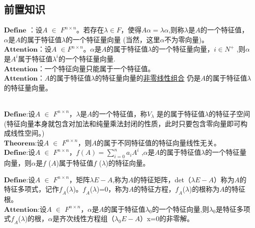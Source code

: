 \documentclass[lang=cn,10pt]{elegantbook}
\begin{document}
\subsection{前置知识}
$\mathbf{Define}$ ：设$\mathit{A}$ $\in$ $\mathit{F^{n\times n} }$。若存在$\lambda \in\mathit{F}$，使得$\mathit{A\alpha = \lambda\alpha}$,则称$\lambda$是$\mathit{A}$的一个特征值，$\alpha$是$\mathit{A}$的属于特征值$\lambda$的一个特征量向量 (当然，这里$\alpha$不为零向量)。
~\\


$\mathbf{Attention}$：设$\mathit{A}$ $\in$$\mathit{F^{n\times n} }$。$\alpha$是$\mathit{A}$的属于特征值$\lambda$的一个特征量向量，$\mathit{i} \in\mathit{N^{+} }$ ,则$\alpha$是$\mathit{A^{\mathit{i}} }$属于特征值$\mathit{\lambda^{\mathit{i}} }$的一个特征量向量.	~\\

$\mathbf{Attention}$：一个特征向量只能属于一个特征值。
~\\

$\mathbf{Attention}$：$\mathit{A}$的属于特征值$\lambda$的特征量向量的\underline{非零线性组合} 仍是$\mathit{A}$的属于特征值$\lambda$的特征量向量。

~\\


$\mathbf{Define}$:设$\mathit{A}$ $\in$ $\mathit{F^{n\times n} }$，$\lambda$是$\mathit{A}$的一个特征值，称$\mathit{V_{\lambda } }$ 是的属于特征值$\lambda$的特征子空间(特征向量本身就包含对加法和纯量乘法封闭的性质，此时只要包含零向量即可构成线性空间。) ~\\

$\mathbf{Theorem}$:设$\mathit{A}$ $\in$ $\mathit{F^{n\times n} }$，则$\mathit{A}$的属于不同特征值的特征向量线性无关。~\\

$\mathbf{Define}$:设$\mathit{A}$ $\in$ $\mathit{F^{n\times n} }$，$\mathit{f} (A)=\sum_{\mathit{i=0} }^{n} a_{i} A^{i} $ ,$\alpha$是$\mathit{A}$的属于特征值$\lambda$的一个特征量向量，则$\alpha$是$\mathit{f}$ ($\mathit{A}$)属于特征值$\mathit{f}$ ($\lambda$)的特征向量。

$\mathbf{Define}$:设$\mathit{A}$ $\in$ $\mathit{F^{n\times n} }$，矩阵$\lambda$$\mathit{E-A}$,称为$\mathit{A}$的特征矩阵，det（$\lambda$$\mathit{E-A}$）称为$\mathit{A}$的特征多项式，记作$\mathit{f_{A}}$($\lambda$)。$\mathit{f_{A}}$($\lambda$)=0，称为$\mathit{A}$的特征方程，$\mathit{f_{A}}$($\lambda$)的根称为$\mathit{A}$的特征根。~\\

$\mathbf{Attention}$:设$\mathit{A}$ $\in$ $\mathit{F^{n\times n} }$，$\alpha$是$\mathit{A}$的属于特征值$\lambda$$_{0}$的一个特征向量,则$\lambda$$_{0}$是特征多项式$\mathit{f_{A}}$($\lambda$)的根，$\alpha$是齐次线性方程组（$\lambda$$_{0}$$\mathit{E-A}$）x=0的非零解。
\end{document}
